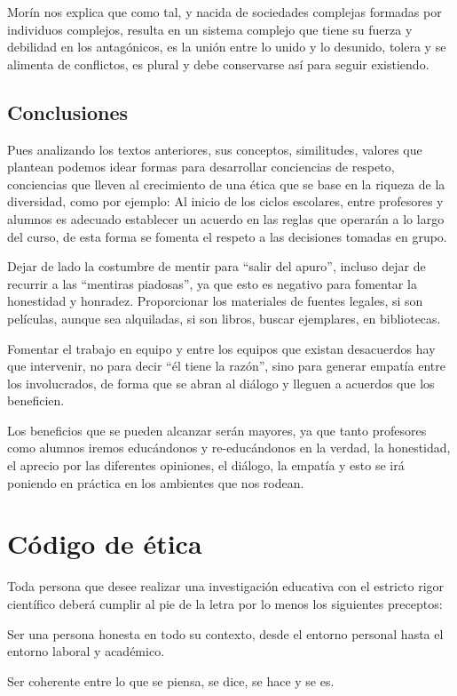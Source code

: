 Morín nos explica que como tal, y nacida de sociedades complejas formadas por individuos complejos, resulta en un sistema complejo que tiene su fuerza y debilidad en los antagónicos, es la unión entre lo unido y lo desunido, tolera y se alimenta de conflictos, es plural y debe conservarse así para seguir existiendo.
\section{Conclusiones}
Pues analizando los textos anteriores, sus conceptos, similitudes, valores que plantean podemos idear formas para desarrollar conciencias de respeto, conciencias que lleven al crecimiento de una ética que se base en la riqueza de la diversidad, como por ejemplo: Al inicio de los ciclos escolares, entre profesores y alumnos es adecuado establecer un acuerdo en las reglas que operarán a lo largo del curso, de esta forma se fomenta el respeto a las decisiones tomadas en grupo.

Dejar de lado la costumbre de mentir para “salir del apuro”, incluso dejar de recurrir a las “mentiras piadosas”, ya que esto es negativo para fomentar la honestidad y honradez.
Proporcionar los materiales de fuentes legales, si son películas, aunque sea alquiladas, si son libros, buscar ejemplares, en bibliotecas.

Fomentar el trabajo en equipo y entre los equipos que existan desacuerdos hay que intervenir, no para decir “él tiene la razón”, sino para generar empatía entre los involucrados, de forma que se abran al diálogo y lleguen a acuerdos que los beneficien.

Los beneficios que se pueden alcanzar serán mayores, ya que tanto profesores como alumnos iremos educándonos y re-educándonos en la verdad, la honestidad, el aprecio por las diferentes opiniones, el diálogo, la empatía y esto se irá poniendo en práctica en los ambientes que nos rodean.

\chapter{Código de ética}
Toda persona que desee realizar una investigación educativa con el estricto rigor científico deberá cumplir al pie de la letra por lo menos los siguientes preceptos:

Ser una persona honesta en todo su contexto, desde el entorno personal hasta el entorno laboral y académico.

Ser coherente entre lo que se piensa, se dice, se hace y se es.

